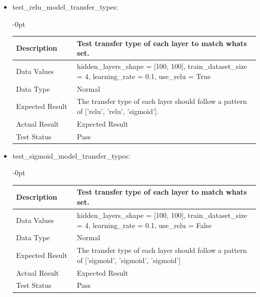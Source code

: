 \documentclass[./project-report/src/latex/project-report.tex]{subfiles}
\begin{document}
\begin{itemize}
\begin{itemize}
\begin{itemize}
					\vspace{5mm}

					\item test\_relu\_model\_transfer\_types: \newline
					\begin{adjustwidth}{-\leftmargin}{0pt}
					\begin{tabular}{|p{0.25\linewidth}|p{0.75\linewidth}|}
						\hline
						Description & Test transfer type of each layer to match whats set. \\
						\hline
						Data Values & hidden\_layers\_shape = [100, 100], \newline
                        	train\_dataset\_size = 4, \newline
                            learning\_rate = 0.1, \newline
                            use\_relu = True \\
						\hline
						Data Type & Normal \\
						\hline
						Expected Result & The transfer type of each layer should follow a pattern of ['relu', 'relu', 'sigmoid']. \\
						\hline
						Actual Result & Expected Result \\
						\hline
						Test Status & Pass \\
						\hline
					\end{tabular}
					\end{adjustwidth}
					
					\vspace{5mm}

					\item test\_sigmoid\_model\_transfer\_types: \newline
					\begin{adjustwidth}{-\leftmargin}{0pt}
					\begin{tabular}{|p{0.25\linewidth}|p{0.75\linewidth}|}
						\hline
						Description & Test transfer type of each layer to match whats set. \\
						\hline
						Data Values & hidden\_layers\_shape = [100, 100], \newline
                        	train\_dataset\_size = 4, \newline
                            learning\_rate = 0.1, \newline
                            use\_relu = False \\
						\hline
						Data Type & Normal \\
						\hline
						Expected Result & The transfer type of each layer should follow a pattern of ['sigmoid', 'sigmoid', 'sigmoid'] \\
						\hline
						Actual Result & Expected Result \\
						\hline
						Test Status & Pass \\
						\hline
					\end{tabular}
					\end{adjustwidth}
					

\end{itemize}
\end{itemize}
\end{itemize}
\end{document}
